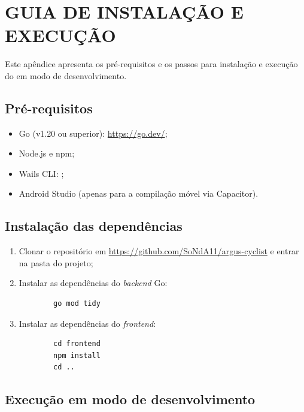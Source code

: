
\chapter{GUIA DE INSTALAÇÃO E EXECUÇÃO}
\label{ap:instalacao}

Este apêndice apresenta os pré-requisitos e os passos para instalação e
execução do \argus{} em modo de desenvolvimento.

\section{Pré-requisitos}
\label{ap:instalacao-pre-requisitos}

\begin{itemize}
    \item Go (v1.20 ou superior): \url{https://go.dev/};
    \item Node.js e npm;
    \item Wails CLI: ;
    \item Android Studio (apenas para a compilação móvel via Capacitor).
\end{itemize}

\section{Instalação das dependências}
\label{ap:instalacao-dependencias}

\begin{enumerate}
    \item Clonar o repositório em
        \url{https://github.com/SoNdA11/argus-cyclist} e entrar na pasta do
        projeto;
    \item Instalar as dependências do \textit{backend} Go:
        \begin{verbatim}
        go mod tidy
        \end{verbatim}
    \item Instalar as dependências do \textit{frontend}:
        \begin{verbatim}
        cd frontend
        npm install
        cd ..
        \end{verbatim}
\end{enumerate}

\section{Execução em modo de desenvolvimento}
\label{ap:instalacao-execucao}

